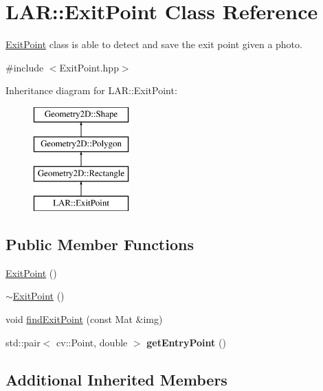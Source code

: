 \hypertarget{class_l_a_r_1_1_exit_point}{}\section{L\+AR\+:\+:Exit\+Point Class Reference}
\label{class_l_a_r_1_1_exit_point}


\mbox{\hyperlink{class_l_a_r_1_1_exit_point}{Exit\+Point}} class is able to detect and save the exit point given a photo.  




{\ttfamily \#include $<$Exit\+Point.\+hpp$>$}

Inheritance diagram for L\+AR\+:\+:Exit\+Point\+:\begin{figure}[H]
\begin{center}
\leavevmode
\includegraphics[height=4.000000cm]{class_l_a_r_1_1_exit_point}
\end{center}
\end{figure}
\subsection*{Public Member Functions}
\begin{DoxyCompactItemize}
\item 
\mbox{\hyperlink{class_l_a_r_1_1_exit_point_a832d0cb82dbbf3654605611fcccf0410}{Exit\+Point}} ()
\item 
\mbox{\hyperlink{class_l_a_r_1_1_exit_point_a1251666aa7cb325b370a69bf9a72272a}{$\sim$\+Exit\+Point}} ()
\item 
void \mbox{\hyperlink{class_l_a_r_1_1_exit_point_a1f76dfc40d2803181e33ffe5e412f592}{find\+Exit\+Point}} (const Mat \&img)
\item 
\mbox{\label{class_l_a_r_1_1_exit_point_ae66c65d6a2d730da5b6a273031ac894e}} 
std\+::pair$<$ cv\+::\+Point, double $>$ {\bfseries get\+Entry\+Point} ()
\end{DoxyCompactItemize}
\subsection*{Additional Inherited Members}


